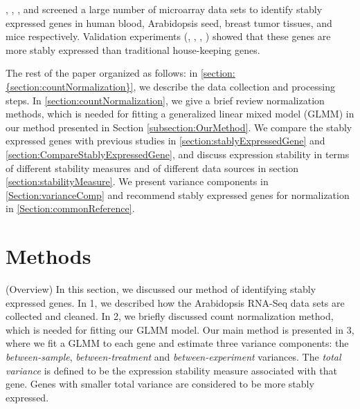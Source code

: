 \documentclass[11pt, a4paper]{article}
\begin{document}
\cite{stamova2009identification},  \citet{dekkers2012identification}, \citet{gur2009identification}, and
 \citet{frericks2008toolbox} screened a large number of microarray data sets
 to identify stably expressed genes in human blood, Arabidopsis seed, breast tumor tissues,
 and mice respectively.
Validation experiments (\cite{czechowski2005genome},
\cite{dekkers2012identification}, \cite{huggett2005real},
\cite{stamova2009identification}) showed that these genes are more stably
expressed than traditional house-keeping genes.  




The rest of the paper organized as follows: in \ref{section:{section:countNormalization}}, we describe the data collection and processing steps. In \ref{section:countNormalization}, we give a brief review normalization methods, which is needed for fitting a generalized linear mixed model (GLMM) \citep{mccullagh1989generalized} in our method presented in Section \ref{subsection:OurMethod}. We compare the stably expressed genes with previous studies in \ref{section:stablyExpressedGene} and \ref{section:CompareStablyExpressedGene}, and discuss expression stability in terms of different stability measures and of different data sources in section \ref{section:stabilityMeasure}. We present variance components in \ref{Section:varianceComp} and recommend stably expressed genes for normalization in \ref{Section:commonReference}.

\section{Methods} \label{section:Methods}
(Overview) In this section, we discussed our method of identifying stably expressed genes. In 1, we described how the Arabidopsis RNA-Seq data sets are collected and cleaned. In 2, we briefly discussed count normalization method, which is needed for fitting our GLMM model. Our main method is presented in 3, where we fit a GLMM to each gene and estimate three variance components: the \textit{between-sample}, \textit{between-treatment} and \textit{between-experiment} variances.
 The \textit{total variance} is defined to be the expression stability measure associated with that gene. Genes with smaller total variance are considered to be more stably expressed. 
\end{document}
